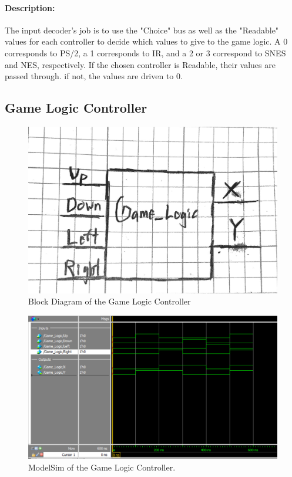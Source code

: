 \documentclass[]{article}
\begin{document}
\paragraph{Description:} The input decoder's job is to use the "Choice" bus as well as the "Readable" values for each controller to decide which values to give to the game logic. A 0 corresponds to PS/2, a 1 corresponds to IR, and a 2 or 3 correspond to SNES and NES, respectively. If the chosen controller is Readable, their values are passed through. if not, the values are driven to 0.

\subsection{Game Logic Controller}
\begin{figure}[H]\centering
	\includegraphics[width=\linewidth]{figures/Game_Logic_Diagram}
	\caption{Block Diagram of the Game Logic Controller}
\end{figure}
\begin{figure}[H]\centering
	\includegraphics[width=\linewidth]{figures/Game_Logic_ModelSim.png}
	\caption{ModelSim of the Game Logic Controller.}
\end{figure}
\end{document}
